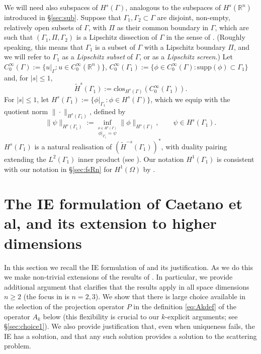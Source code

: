 \documentclass{birkjour}
\theoremstyle{definition}
\theoremstyle{remark}
\numberwithin{equation}{section}
\newcommand{\R}{\mathbb{R}}
\begin{document}
We will need also subspaces of $H^s(\Gamma)$, analogous to the subspaces of $H^s(\R^n)$ introduced in \S\ref{sec:sub}. Suppose that $\Gamma_1,\Gamma_2\subset \Gamma$ are disjoint, non-empty, relatively open subsets of $\Gamma$, with $\Pi$ as their common boundary in $\Gamma$, which are such that $(\Gamma_1,\Pi,\Gamma_2)$ is a Lipschitz dissection of $\Gamma$ in the sense of \cite[p.~99]{mclean2000strongly}. (Roughly speaking, this means that $\Gamma_1$ is a subset of $\Gamma$ with a Lipschitz boundary $\Pi$, and we will refer to $\Gamma_1$ as a {\em Lipschitz subset} of $\Gamma$, or as a {\em Lipschitz screen}.)  Let $C_0^\infty(\Gamma):= \{u|_\Gamma:u\in C_0^\infty(\R^n)\}$, $C_0^\infty(\Gamma_1) := \{\phi\in C_0^\infty(\Gamma):\mathrm{supp}(\phi)\subset \Gamma_1\}$ and, for $|s|\leq 1$,
$$
\widetilde H^s(\Gamma_1) :=  \text{clos}_{H^s(\Gamma)}(C^{\infty}_0(\Gamma_1)).%
$$
For $|s|\leq 1$, let $H^s(\Gamma_1) := \{\phi|_{\Gamma_1}:\phi\in H^s(\Gamma)\}$, which we equip with the quotient norm $\|\cdot\|_{H^s(\Gamma_1)}$, defined by 
$$
\|\psi\|_{H^s(\Gamma_1)} := \inf_{\stackrel{\phi\in H^s(\Gamma)}{\phi|_{\Gamma_1} = \psi}}\|\phi\|_{H^s(\Gamma)}, \qquad \psi \in H^s(\Gamma_1).
$$ %
$H^s(\Gamma_1)$ is a natural realisation of $(\widetilde H^{-s}(\Gamma_1))^*$, with duality pairing extending the $L^2(\Gamma_1)$ inner product (see \cite[p.~99, Theorem 3.30]{mclean2000strongly}). Our notation $H^1(\Gamma_1)$ is consistent with our notation in \S\ref{sec:fsRn} for $H^1(\Omega)$ by \cite[p.~99, Theorem 3.30]{mclean2000strongly}.



\section{The IE formulation of Caetano et al, and its extension to higher dimensions} \label{sec:IE}
In this section we recall the IE formulation of \cite[\S3(a)]{caetano2025integral} and its justification. As we do this we make non-trivial extensions of the results of \cite{caetano2025integral}. In particular, we provide additional argument that clarifies that the results apply in all space dimensions $n\geq 2$ (the focus in \cite{caetano2025integral} is $n=2,3$). We show that there is large choice available in the selection of the projection operator $P$ in the definition \eqref{eq:Akdef} of the operator $A_k$ below (this flexibility is crucial to our $k$-explicit arguments; see \S\ref{sec:choice1}). We also provide justification that, even when uniqueness fails, the IE has a solution, and that any such solution provides a solution to the scattering problem.
\end{document}
